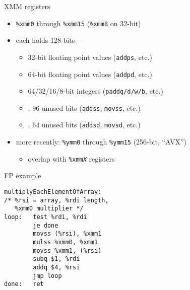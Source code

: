 \begin{frame}{XMM registers}
\begin{itemize}
\item {\tt \%xmm0} through {\tt \%xmm15} {\small ({\tt \%xmm8} on 32-bit)}
\item each holds 128-bits ---
    \begin{itemize}
    \item 32-bit floating point values ({\tt addps}, etc.)
    \item 64-bit floating point values ({\tt addpd}, etc.) 
    \item 64/32/16/8-bit integers ({\tt paddq/d/w/b}, etc.)
    \item {}, 96 unused bits ({\tt addss}, {\tt movss}, etc.)
    \item {}, 64 unused bits ({\tt addsd}, {\tt movsd}, etc.)
    \end{itemize}
\vspace{.5cm}
\item more recently: {\tt \%ymm0} through {\tt \%ymm15} (256-bit, ``AVX'')
    \begin{itemize}
    \item overlap with {\tt\%xmm{\it X}} registers
    \end{itemize}
\end{itemize}
\end{frame}

\begin{frame}[fragile,label=fpExample]{FP example}
\begin{lstlisting}
multiplyEachElementOfArray:
/* %rsi = array, %rdi length,
   %xmm0 multiplier */
loop:   test %rdi, %rdi
        je done
        movss (%rsi), %xmm1
        mulss %xmm0, %xmm1
        movss %xmm1, (%rsi)
        subq $1, %rdi
        addq $4, %rsi
        jmp loop
done:   ret
\end{lstlisting}
\end{frame}


